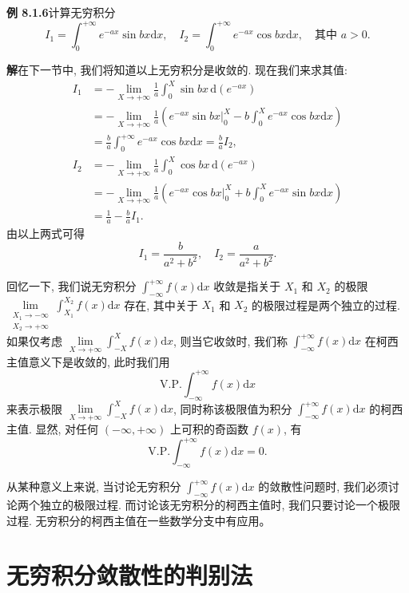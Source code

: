 \documentclass[UTF8, 12pt, fontset=fandol, oneside]{ctexart}
\begin{document}
\noindent\textbf{例 8.1.6}\quad 计算无穷积分
\[
  I_1=\int_0^{+\infty}e^{-ax}\sin bx\mathrm dx,\quad
  I_2=\int_0^{+\infty}e^{-ax}\cos bx\mathrm dx,\quad
  \text{其中 }a>0.
\]

\noindent\textbf{解}\quad 在下一节中, 我们将知道以上无穷积分是收敛的. 现在我们来求其值:
\[
\begin{aligned}
  I_1
  &=
  -\lim_{X\to+\infty}\frac1a\int_0^X\sin bx\,\mathrm d(e^{-ax})\\
  &=
  -\lim_{X\to+\infty}\frac1a\left(e^{-ax}\sin bx\big|_0^X
  -
  b\int_0^X e^{-ax}\cos bx\mathrm dx\right)\\
  &=
  \frac ba\int_0^{+\infty}e^{-ax}\cos bx\mathrm dx
  =
  \frac ba I_2,
\end{aligned}
\]
\[
\begin{aligned}
  I_2
  &=
  -\lim_{X\to+\infty}\frac1a\int_0^X\cos bx\,\mathrm d(e^{-ax})\\
  &=
  -\lim_{X\to+\infty}\frac1a\left(e^{-ax}\cos bx\big|_0^X
  +
  b\int_0^X e^{-ax}\sin bx\mathrm dx\right)\\
  &=
  \frac1a-\frac ba I_1.
\end{aligned}
\]
由以上两式可得
\[
  I_1=\frac b{a^2+b^2},\quad I_2=\frac a{a^2+b^2}.
\]

回忆一下, 我们说无穷积分 $\int_{-\infty}^{+\infty}f(x)\mathrm dx$ 收敛是指关于 $X_1$ 和 $X_2$ 的极限\allowbreak $\lim\limits_{\substack{X_1\to-\infty\\ X_2\to+\infty}}\int_{X_1}^{X_2}f(x)\mathrm dx$ 存在, 其中关于 $X_1$ 和 $X_2$ 的极限过程是两个独立的过程. 如果仅考虑 $\lim\limits_{X\to+\infty}\int_{-X}^X f(x)\mathrm dx$, 则当它收敛时, 我们称 $\int_{-\infty}^{+\infty}f(x)\mathrm dx$ 在柯西主值意义下是收敛的, 此时我们用
\[
  \mathrm{V.P.}\int_{-\infty}^{+\infty}f(x)\mathrm dx
\]
来表示极限 $\lim\limits_{X\to+\infty}\int_{-X}^X f(x)\mathrm dx$, 同时称该极限值为积分 $\int_{-\infty}^{+\infty}f(x)\mathrm dx$ 的柯西主值. 显然, 对任何 $(-\infty,+\infty)$ 上可积的奇函数 $f(x)$, 有
\[
  \mathrm{V.P.}\int_{-\infty}^{+\infty}f(x)\mathrm dx=0.
\]

从某种意义上来说, 当讨论无穷积分 $\int_{-\infty}^{+\infty}f(x)\mathrm dx$ 的敛散性问题时, 我们必须讨论两个独立的极限过程. 而讨论该无穷积分的柯西主值时, 我们只要讨论一个极限过程. 无穷积分的柯西主值在一些数学分支中有应用。

\section{无穷积分敛散性的判别法}
\end{document}
